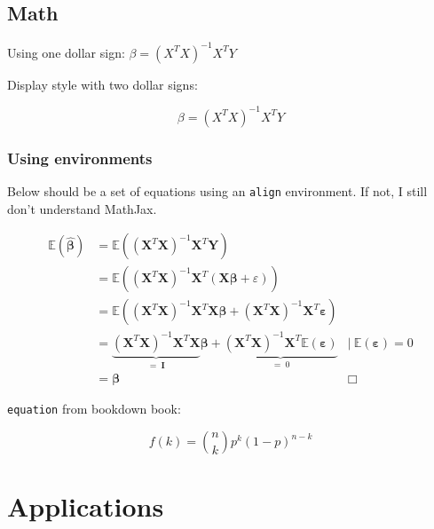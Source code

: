 \documentclass[ngerman,a4paper,]{scrartcl}
\begin{document}
\hypertarget{math}{%
\subsection{Math}\label{math}}

Using one dollar sign: \(\beta = (X^T X)^{-1} X^T Y\)

Display style with two dollar signs:

\[\beta = (X^T X)^{-1} X^T Y\]

\hypertarget{using-environments}{%
\subsubsection{Using environments}\label{using-environments}}

Below should be a set of equations using an \texttt{align} environment. If not, I still don't understand MathJax.

\begin{align}
\mathbb{E}(\widehat{\boldsymbol{\beta}}) 
&= \mathbb{E}\left( \left(\boldsymbol{X}^T \boldsymbol{X}\right)^{-1} \boldsymbol{X}^T \boldsymbol{Y} \right) \\
&= \mathbb{E}\left( \left(\boldsymbol{X}^T \boldsymbol{X}\right)^{-1} \boldsymbol{X}^T \left(\boldsymbol{X} \boldsymbol{\beta}+ \varepsilon \right) \right) \\
&= \mathbb{E}\left( 
   \left(\boldsymbol{X}^T \boldsymbol{X}\right)^{-1} \boldsymbol{X}^T \boldsymbol{X} \boldsymbol{\beta} 
 + \left(\boldsymbol{X}^T \boldsymbol{X}\right)^{-1} \boldsymbol{X}^T \boldsymbol{\varepsilon}
   \right) \\
&= \underbrace{\left(\boldsymbol{X}^T \boldsymbol{X}\right)^{-1} \boldsymbol{X}^T \boldsymbol{X}}_{=\ \boldsymbol{I}} \boldsymbol{\beta} 
 + \underbrace{\left(\boldsymbol{X}^T \boldsymbol{X}\right)^{-1} \boldsymbol{X}^T \mathbb{E}(\boldsymbol{\varepsilon})}_{=\ 0}
 & \Bigg\vert\ \mathbb{E}(\boldsymbol{\varepsilon}) = 0\\
&= \boldsymbol{\beta} & \Box
\end{align}

\texttt{equation} from bookdown book:

\begin{equation} 
  f\left(k\right) = \binom{n}{k} p^k\left(1-p\right)^{n-k}
  \label{eq:binom}
\end{equation}

\hypertarget{applications}{%
\section{Applications}\label{applications}}
\end{document}
